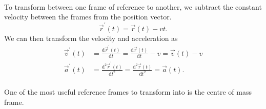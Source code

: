 \documentclass[../newtonian_mechanics.tex]{subfiles}
\begin{document}
        \paragraph{}
        To transform between one frame of reference to another, we subtract the constant velocity between the frames from the position vector.
        \begin{equation}
            \vec{r}^\prime(t) = \vec{r}(t) - vt.
        \end{equation}
        We can then transform the velocity and acceleration as
        \begin{align}
            \vec{v}^\prime(t)&=\frac{\mathrm{d}\vec{r}^\prime(t)}{\mathrm{d}t}=\frac{\mathrm{d}\vec{r}(t)}{\mathrm{d}t}-v=\vec{v}(t)-v\\
            \vec{a}^\prime(t)&=\frac{\mathrm{d}^2\vec{r}^\prime(t)}{\mathrm{d}t^2}=\frac{\mathrm{d}^2\vec{r}(t)}{\mathrm{d}t^2}=\vec{a}(t).
        \end{align}

        \paragraph{}
        One of the most useful reference frames to transform into is the centre of mass frame.
\end{document}
